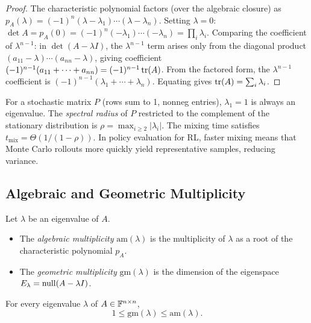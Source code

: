 \documentclass[11pt,a4paper]{article}
\begin{document}
\begin{proof}
The characteristic polynomial factors (over the algebraic closure) as
$p_A(\lambda) = (-1)^n(\lambda - \lambda_1) \cdots (\lambda - \lambda_n)$.
Setting $\lambda = 0$: $\det A = p_A(0) = (-1)^n(-\lambda_1) \cdots (-\lambda_n)
= \prod_i \lambda_i$.
Comparing the coefficient of $\lambda^{n-1}$: in $\det(A - \lambda I)$,
the $\lambda^{n-1}$ term arises only from the diagonal product
$(a_{11} - \lambda) \cdots (a_{nn} - \lambda)$, giving coefficient
$(-1)^{n-1}(a_{11} + \cdots + a_{nn}) = (-1)^{n-1} \operatorname{tr}(A)$.
From the factored form, the $\lambda^{n-1}$ coefficient is
$(-1)^{n-1}(\lambda_1 + \cdots + \lambda_n)$.  Equating gives
$\operatorname{tr}(A) = \sum_i \lambda_i$.
\end{proof}

\begin{rlconnection}[title={Spectral Radius and Markov Chain Mixing}]
For a stochastic matrix $P$ (rows sum to 1, nonneg entries), $\lambda_1 = 1$
is always an eigenvalue.  The \emph{spectral radius} of $P$ restricted
to the complement of the stationary distribution is
$\rho = \max_{i \geq 2} |\lambda_i|$.  The mixing time satisfies
$t_{\mathrm{mix}} = \Theta(1/(1-\rho))$.  In policy evaluation for RL,
faster mixing means that Monte Carlo rollouts more quickly yield
representative samples, reducing variance.
\end{rlconnection}

\subsection{Algebraic and Geometric Multiplicity}

\begin{definition}
\label{def:multiplicity}
Let $\lambda$ be an eigenvalue of $A$.
\begin{itemize}[nosep]
  \item The \emph{algebraic multiplicity} $\mathrm{am}(\lambda)$ is the
        multiplicity of $\lambda$ as a root of the characteristic polynomial
        $p_A$.
  \item The \emph{geometric multiplicity} $\mathrm{gm}(\lambda)$ is the
        dimension of the eigenspace $E_\lambda = \operatorname{null}(A - \lambda I)$.
\end{itemize}
\end{definition}

\begin{theorem}
\label{thm:multiplicity_ineq}
For every eigenvalue $\lambda$ of $A \in \mathbb{F}^{n \times n}$,
\[
  1 \leq \mathrm{gm}(\lambda) \leq \mathrm{am}(\lambda).
\]
\end{theorem}
\end{document}

